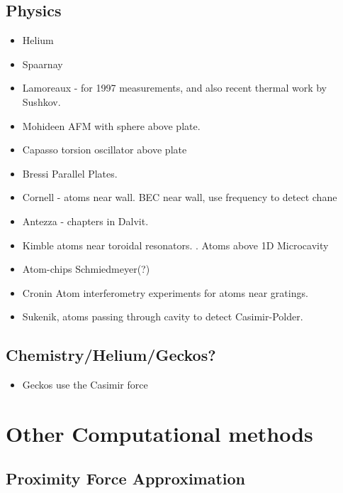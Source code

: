 \subsection{Physics}
\begin{itemize}
\item Helium
\item Spaarnay
\item Lamoreaux - for 1997 measurements\cite{Lamoreaux1997}, and also recent thermal work by Sushkov\cite{Sushkov2011}.
\item Mohideen \cite{Mohideen1998} AFM with sphere above plate.
\item Capasso \cite{Chan2001}  torsion oscillator above plate
\item Bressi \cite{Bressi2002} Parallel Plates.
\item Cornell - atoms near wall\cite{Harber2005, Obrecht2007}.  BEC near wall, use frequency to detect chane
\item Antezza - chapters in Dalvit.  
\item Kimble atoms near toroidal resonators.  \cite{Alton2011}.  Atoms above 1D Microcavity \cite{Hung2013}
\item Atom-chips  Schmiedmeyer\cite{Folman2000,Schneider2003}(?)
\item Cronin \cite{Perreault2005,Lonij2009}  Atom interferometry experiments for atoms near gratings.
\item Sukenik\cite{Sukenik1993}, atoms passing through cavity to detect Casimir-Polder.  
\end{itemize}

\subsection{Chemistry/Helium/Geckos?}

\begin{itemize}
\item Geckos use the Casimir force \cite{Autumn2002}
\end{itemize}

\section{Other Computational methods}

\subsection{Proximity Force Approximation}

